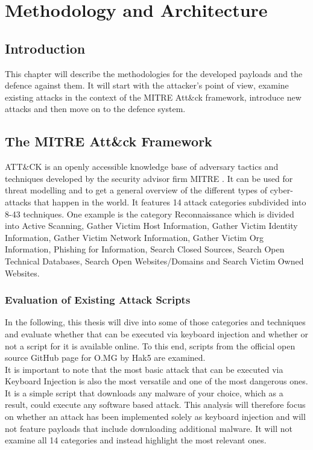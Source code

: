 \chapter{Methodology and Architecture} \label{Methodology}

\section{Introduction}

This chapter will describe the methodologies for the developed payloads and the defence against them. It will start with the attacker's point of view, examine existing attacks in the context of the MITRE Att\&ck framework, introduce new attacks and then move on to the defence system.


\section{The MITRE Att\&ck Framework}

ATT\&CK \cite{MITREATTCK} is an openly accessible knowledge base of adversary tactics and techniques developed by the security advisor firm MITRE \cite{WhoWeAre}. It can be used for threat modelling and to get a general overview of the different types of cyber-attacks that happen in the world.
It features 14 attack categories subdivided into 8-43 techniques. One example is the category Reconnaissance which is divided into Active Scanning, Gather Victim Host Information, Gather Victim Identity Information, Gather Victim Network Information, Gather Victim Org Information, Phishing for Information, Search Closed Sources, Search Open Technical Databases, Search Open Websites/Domains and Search Victim Owned Websites. 



\subsection{Evaluation of Existing Attack Scripts}

In the following, this thesis will dive into some of those categories and techniques and evaluate whether that can be executed via keyboard injection and whether or not a script for it is available online. To this end, scripts from the official open source GitHub page for O.MG \cite{Hak5Omgpayloads2024} by Hak5 are examined. \\
It is important to note that the most basic attack that can be executed via Keyboard Injection is also the most versatile and one of the most dangerous ones. It is a simple script that downloads any malware of your choice, which as a result, could execute any software based attack.  
This analysis will therefore focus on whether an attack has been implemented solely as keyboard injection and will not feature payloads that include downloading additional malware. It will not examine all 14 categories and instead highlight the most relevant ones. 

